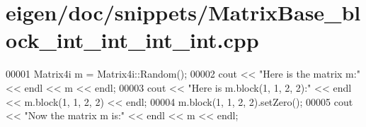 \hypertarget{eigen_2doc_2snippets_2_matrix_base__block__int__int__int__int_8cpp_source}{}\section{eigen/doc/snippets/\+Matrix\+Base\+\_\+block\+\_\+int\+\_\+int\+\_\+int\+\_\+int.cpp}
\label{eigen_2doc_2snippets_2_matrix_base__block__int__int__int__int_8cpp_source}

\begin{DoxyCode}
00001 Matrix4i m = Matrix4i::Random();
00002 cout << \textcolor{stringliteral}{"Here is the matrix m:"} << endl << m << endl;
00003 cout << \textcolor{stringliteral}{"Here is m.block(1, 1, 2, 2):"} << endl << m.block(1, 1, 2, 2) << endl;
00004 m.block(1, 1, 2, 2).setZero();
00005 cout << \textcolor{stringliteral}{"Now the matrix m is:"} << endl << m << endl;
\end{DoxyCode}
